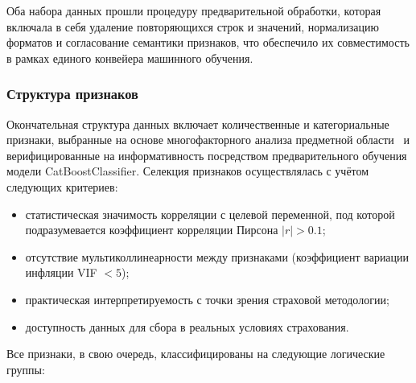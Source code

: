 Оба набора данных прошли процедуру предварительной обработки, которая включала в себя удаление повторяющихся строк и значений, нормализацию форматов и согласование семантики признаков, что обеспечило их совместимость в рамках единого конвейера машинного обучения.
\subsubsection{Структура признаков}
\label{subsec:feature_structure}

Окончательная структура данных включает количественные и категориальные признаки, выбранные на основе многофакторного анализа предметной области~\cite{kornilov2004insurance} и верифицированные на информативность посредством предварительного обучения модели CatBoostClassifier. Селекция признаков осуществлялась с учётом следующих критериев:
\begin{itemize}
    \item статистическая значимость корреляции с целевой переменной, под которой подразумевается коэффициент корреляции Пирсона $|r| > 0.1$;
    \item отсутствие мультиколлинеарности между признаками (коэффициент вариации инфляции VIF $< 5$);
    \item практическая интерпретируемость с точки зрения страховой методологии;
    \item доступность данных для сбора в реальных условиях страхования.
\end{itemize}

Все признаки, в свою очередь, классифицированы на следующие логические группы:

